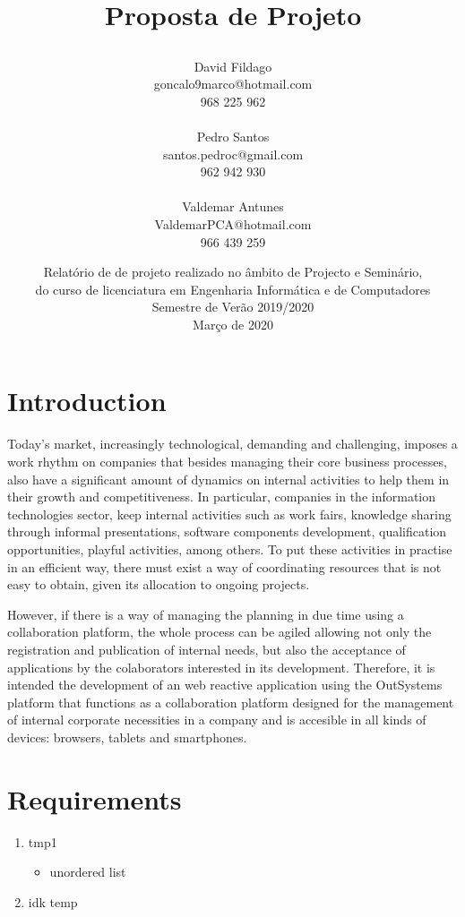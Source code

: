 \documentclass[a4paper,openright,12pt]{report}
\title{%
  \vspace{-50mm}
  \begin{minipage}[l]{150mm}
    \resizebox{50mm}{!}{\texttt{[image: ./img/logo\_isel.png]}}
  \end{minipage}\\
  \vspace{20mm}
  \textbf{Proposta de Projeto}
}
\author{%
  \begin{tabular}{ll}
      & David Fildago \\
      & goncalo9marco@hotmail.com\\
      & 968 225 962
  \\\\
    & Pedro Santos \\
    & santos.pedroc@gmail.com \\
    & 962 942 930
  \\\\
    & Valdemar Antunes \\
    & ValdemarPCA@hotmail.com \\
    & 966 439 259
  \end{tabular}
}
\date{%
\vspace{60mm}
Relatório de  de projeto realizado no âmbito de Projecto e Seminário,\\
do curso de licenciatura em Engenharia Informática e de Computadores\\
Semestre de Verão 2019/2020
\vspace{20mm}\\
Março de 2020}
\begin{document}
\thispagestyle{empty}
\maketitle
\section*{Introduction}
  Today's market, increasingly technological, demanding and challenging, imposes a work rhythm on companies that besides managing their core business processes, also have a significant amount of dynamics on internal activities to help them in their growth and competitiveness. In particular, companies in the information technologies sector, keep internal activities such as work fairs, knowledge sharing through informal presentations, software components development, qualification opportunities, playful activities, among others. To put these activities in practise in an efficient way, there must exist a way of coordinating resources that is not easy to obtain, given its allocation to ongoing projects. \par
  However, if there is a way of managing the planning in due time using a collaboration platform, the whole process can be agiled allowing not only the registration and publication of internal needs, but also the acceptance of applications by the colaborators interested in its development. Therefore, it is intended the development of an web reactive application using the OutSystems platform that functions as a collaboration platform designed for the management of internal corporate necessities in a company and is accesible in all kinds of devices: browsers, tablets and smartphones.
    
\section*{Requirements}
\begin{enumerate}
  \item tmp1
  \begin{itemize}
    \item unordered list
  \end{itemize} 
  \item idk temp 
\end{enumerate}
\end{document}
